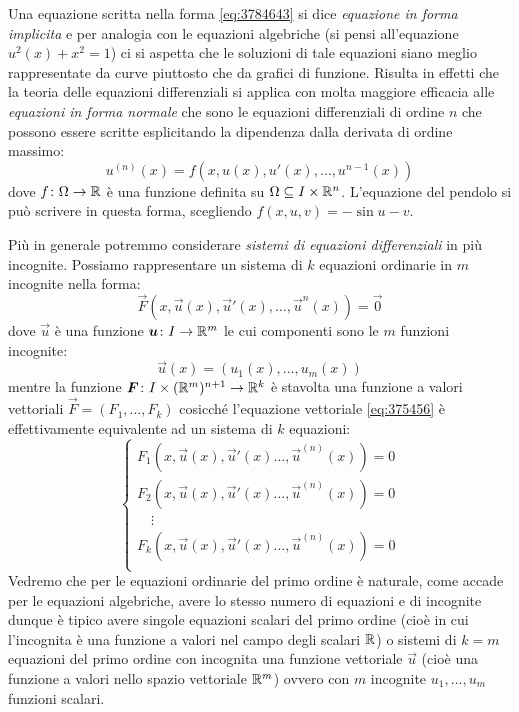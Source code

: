Una equazione scritta nella forma \eqref{eq:3784643} si dice \emph{equazione in forma implicita}
%
%
e per analogia con le equazioni algebriche (si pensi all'equazione
$u^2(x) + x^2 = 1$) ci si aspetta che le soluzioni di tale equazioni siano
meglio rappresentate da curve piuttosto che da grafici di funzione.
Risulta in effetti che la teoria delle equazioni differenziali si applica con
molta maggiore efficacia alle \emph{equazioni in forma normale}
che sono le equazioni differenziali di ordine $n$ che possono essere scritte
esplicitando la dipendenza dalla derivata di ordine massimo:
\begin{equation}\label{eq:366793}
 u^{(n)}(x) = f(x, u(x), u'(x), \dots, u^{n-1}(x))
\end{equation}
dove $f\colon \Omega \to \mathbb R$ è una funzione definita su $\Omega\subseteq I\times \mathbb R^n$.
L'equazione del pendolo si può scrivere in questa forma,
scegliendo $f(x,u,v) = -\sin u - v$.

Più in generale potremmo considerare
\emph{sistemi di equazioni differenziali}
%
%
%
in più incognite.
Possiamo rappresentare un sistema di $k$ equazioni ordinarie in $m$ incognite nella forma:
\begin{equation}\label{eq:375456}
  \vec F(x, \vec u(x), \vec u'(x), \dots, \vec u^{n}(x)) = \vec 0
\end{equation}
dove $\vec u$ è una funzione $\boldsymbol u \colon I \to \mathbb R^m$ le cui componenti sono
le $m$ funzioni incognite:
\[
  \vec u(x) = (u_1(x), \dots, u_m(x))
\]
mentre la funzione $\boldsymbol F \colon I \times (\mathbb R^m)^{n+1} \to \mathbb R^k$ è stavolta
una funzione a valori vettoriali $\vec F = (F_1, \dots, F_k)$ cosicché l'equazione vettoriale
\eqref{eq:375456} è effettivamente equivalente ad un sistema di $k$ equazioni:
\[
\begin{cases}
F_1(x,\vec u(x), \vec u'(x)\dots, \vec u^{(n)}(x)) = 0\\
F_2(x,\vec u(x), \vec u'(x)\dots, \vec u^{(n)}(x)) = 0\\
\quad\vdots \\
F_k(x,\vec u(x), \vec u'(x)\dots, \vec u^{(n)}(x)) = 0\\
\end{cases}
\]
Vedremo che per le equazioni ordinarie del primo ordine è naturale,
come accade per le equazioni algebriche,
avere lo stesso numero di equazioni e di incognite dunque è tipico avere singole
equazioni scalari del primo ordine
(cioè in cui l'incognita è una funzione a valori nel campo
degli scalari $\mathbb R$)
o sistemi di $k=m$ equazioni del primo ordine con incognita una funzione
vettoriale $\vec u$ (cioè una funzione a valori nello spazio vettoriale $\mathbb R^m$)
ovvero con $m$ incognite $u_1,\dots, u_m$ funzioni scalari.

